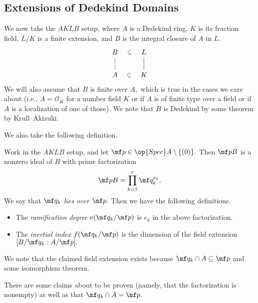 \subsection{Extensions of Dedekind Domains}
We now take the $AKLB$ setup, where $A$ is a Dedekind ring, $K$ is its fraction field, $L/K$ is a finite extension, and $B$ is the integral closure of $A$ in $L.$
\[\begin{tikzcd}
	B & L \\
	A & K
	\arrow[no head, from=2-2, to=1-2]
	\arrow[dashed, no head, from=2-1, to=1-1]
	\arrow["\subseteq"{description}, draw=none, from=1-1, to=1-2]
	\arrow["\subseteq"{description}, draw=none, from=2-1, to=2-2]
\end{tikzcd}\]
We will also assume that $B$ is finite over $A,$ which is true in the cases we care about (i.e., $A=\mathcal O_K$ for a number field $K$ or if $A$ is of finite type over a field or if $A$ is a localization of one of those). We note that $B$ is Dedekind by some theorem by Krull--Akizuki.

We also take the following definition.
\begin{definition}
    Work in the $AKLB$ setup, and let $\mf p\in\op{Spec}A\setminus\{(0)\}.$ Then $\mf pB$ is a nonzero ideal of $B$ with prime factorization
    \[\mf pB=\prod_{k=1}^r\mf q_k^{e_k}.\]
    We say that $\mf q_k$ \textit{lies over} $\mf p.$ Then we have the following definitions.
    \begin{itemize}
        \item The \textit{ramification degree} $e(\mf q_k/\mf p)$ is $e_k$ in the above factorization.
        \item The \textit{inertial index} $f(\mf q_k/\mf p)$ is the dimension of the field extension $[B/\mf q_k:A/\mf p].$
    \end{itemize}
    We note that the claimed field extension exists because $\mf q_k\cap A\subseteq\mf p$ and some isomorphism theorem.
\end{definition}
There are some claims about to be proven (namely, that the factorization is nonempty) as well as that $\mf q_k\cap A=\mf p.$